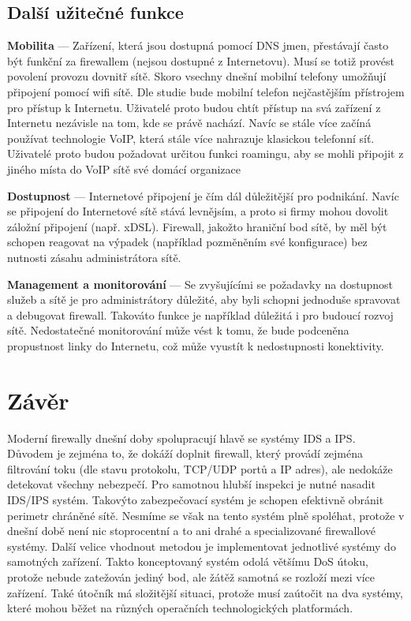 \documentclass[11pt,a4paper]{article}
\begin{document}
\subsection{Další užitečné funkce}
\textbf{Mobilita} --- Zařízení, která jsou dostupná pomocí DNS jmen, přestávají často být funkční za firewallem (nejsou dostupné z Internetovu). Musí se totiž provést povolení provozu dovnitř sítě. Skoro vsechny dnešní mobilní telefony umožňují připojení pomocí wifi sítě. Dle studie bude mobilní telefon nejčastějším přístrojem pro přístup k Internetu. Uživatelé proto budou chtít přístup na svá zařízení z Internetu nezávisle na tom, kde se právě nachází. Navíc se stále více začíná používat technologie VoIP, která stále více nahrazuje klasickou telefonní síť. Uživatelé proto budou požadovat určitou funkci roamingu, aby se mohli připojit z jiného místa do VoIP sítě své domácí organizace

\textbf{Dostupnost} --- Internetové připojení je čím dál důležitější pro podnikání. Navíc se připojení do Internetové sítě stává levnějsím, a proto si firmy mohou dovolit záložní připojení (např. xDSL). Firewall, jakožto hraniční bod sítě, by měl být schopen reagovat na výpadek (například pozměněním své konfigurace) bez nutnosti zásahu administrátora sítě.

\textbf{Management a monitorování} --- Se zvyšujícími se požadavky na dostupnost služeb a sítě je pro administrátory důležité, aby byli schopni jednoduše spravovat a debugovat firewall. Takováto funkce je například důležitá i pro budoucí rozvoj sítě. Nedostatečné monitorování může vést k tomu, že bude podceněna propustnost linky do Internetu, což může vyustít k nedostupnosti konektivity.

\section{Závěr}
Moderní firewally dnešní doby spolupracují hlavě se systémy IDS a IPS. Důvodem je zejména to, že dokáží doplnit firewall, který provádí zejména filtrování toku (dle stavu protokolu, TCP/UDP portů a IP adres), ale nedokáže detekovat všechny nebezpečí. Pro samotnou hlubší inspekci je nutné nasadit IDS/IPS systém. Takovýto zabezpečovací systém je schopen efektivně obránit perimetr chráněné sítě. Nesmíme se však na tento systém plně spoléhat, protože v dnešní době není nic stoprocentní a to ani drahé a specializované firewallové systémy. Další velice vhodnout metodou je implementovat jednotlivé systémy do samotných zařízení. Takto konceptovaný systém odolá většímu DoS útoku, protože nebude zatežován jediný bod, ale žátěž samotná se rozloží mezi více zařízení. Také útočník má složitější situaci, protože musí zaútočit na dva systémy, které mohou běžet na různých operačních technologických platformách.
\nocite{*}
{
	\def\CS{$\cal C\kern-0.1667em\lower.5ex\hbox{$\cal S$}\kern-0.075em $}
	
}
\end{document}

